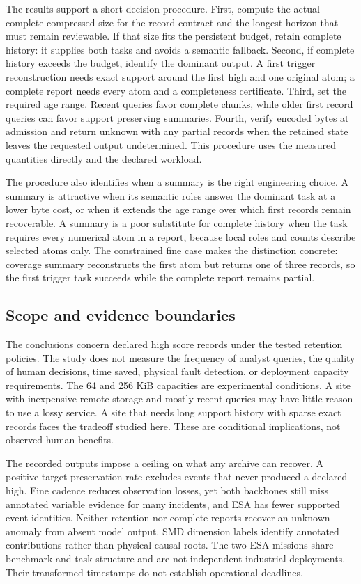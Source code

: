 \documentclass[a4paper,fleqn]{cas-dc}
\begin{document}
The results support a short decision procedure. First, compute the actual complete compressed size for the record contract and the longest horizon that must remain reviewable. If that size fits the persistent budget, retain complete history: it supplies both tasks and avoids a semantic fallback. Second, if complete history exceeds the budget, identify the dominant output. A first trigger reconstruction needs exact support around the first high and one original atom; a complete report needs every atom and a completeness certificate. Third, set the required age range. Recent queries favor complete chunks, while older first record queries can favor support preserving summaries. Fourth, verify encoded bytes at admission and return unknown with any partial records when the retained state leaves the requested output undetermined. This procedure uses the measured quantities directly and the declared workload.

The procedure also identifies when a summary is the right engineering choice. A summary is attractive when its semantic roles answer the dominant task at a lower byte cost, or when it extends the age range over which first records remain recoverable. A summary is a poor substitute for complete history when the task requires every numerical atom in a report, because local roles and counts describe selected atoms only. The constrained fine case makes the distinction concrete: coverage summary reconstructs the first atom but returns one of three records, so the first trigger task succeeds while the complete report remains partial.

\subsection{Scope and evidence boundaries}

The conclusions concern declared high score records under the tested retention policies. The study does not measure the frequency of analyst queries, the quality of human decisions, time saved, physical fault detection, or deployment capacity requirements. The 64 and 256 KiB capacities are experimental conditions. A site with inexpensive remote storage and mostly recent queries may have little reason to use a lossy service. A site that needs long support history with sparse exact records faces the tradeoff studied here. These are conditional implications, not observed human benefits.

The recorded outputs impose a ceiling on what any archive can recover. A positive target preservation rate excludes events that never produced a declared high. Fine cadence reduces observation losses, yet both backbones still miss annotated variable evidence for many incidents, and ESA has fewer supported event identities. Neither retention nor complete reports recover an unknown anomaly from absent model output. SMD dimension labels identify annotated contributions rather than physical causal roots. The two ESA missions share benchmark and task structure and are not independent industrial deployments. Their transformed timestamps do not establish operational deadlines.
\end{document}
